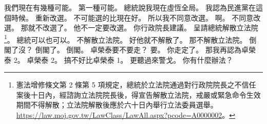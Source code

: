 \hypertarget{w01:cue:2385}{}我們現在有幾種可能。
\hypertarget{w01:cue:2386}{}第一種可能。
\hypertarget{w01:cue:2387}{}總統說我現在虛恆全局。
\hypertarget{w01:cue:2388}{}我認為民進黨在這個時候。
\hypertarget{w01:cue:2389}{}重新改選。
\hypertarget{w01:cue:2390}{}不可能選的比現在好。
\hypertarget{w01:cue:2391}{}所以我不同意改選。
\hypertarget{w01:cue:2392}{}啊。
\hypertarget{w01:cue:2393}{}不同意改選。
\hypertarget{w01:cue:2394}{}那就不改選了。
\hypertarget{w01:cue:2395}{}他不一定要改選。
\hypertarget{w01:cue:2396}{}你行政院長建議。
\hypertarget{w01:cue:2397}{}呈請總統解散立法院\footnote{憲法增修條文第 2 條第 5 項規定，總統於立法院通過對行政院院長之不信任案後十日內，經諮詢立法院院長後，得宣告解散立法院，戒嚴或緊急命令生效期間不得解散；立法院解散後應於六十日內舉行立法委員選舉。\url{https://law.moj.gov.tw/LawClass/LawAll.aspx?pcode=A0000002}。}。
\hypertarget{w01:cue:2398}{}總統可以也可以。
\hypertarget{w01:cue:2399}{}不解散立法院。
\hypertarget{w01:cue:2400}{}好他就不解散了。
\hypertarget{w01:cue:2401}{}那不解散立法院。
\hypertarget{w01:cue:2402}{}倒閣了沒？
\hypertarget{w01:cue:2403}{}倒閣了。
\hypertarget{w01:cue:2404}{}倒閣。
\hypertarget{w01:cue:2405}{}卓榮泰要不要走？
\hypertarget{w01:cue:2406}{}要。
\hypertarget{w01:cue:2407}{}你走定了。
\hypertarget{w01:cue:2408}{}那我再認為卓榮泰 2。
\hypertarget{w01:cue:2409}{}卓榮泰 2。
\hypertarget{w01:cue:2410}{}搞不好比卓榮泰 1。
\hypertarget{w01:cue:2411}{}更聽過來警戈。
\hypertarget{w01:cue:2412}{}你有什麼辦法？

